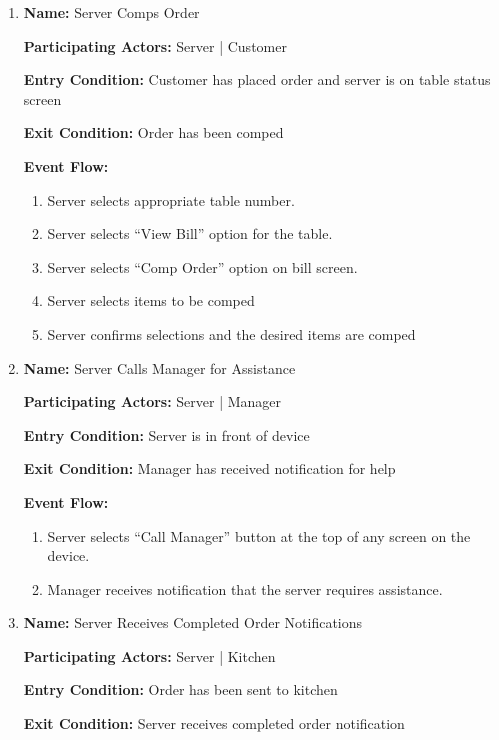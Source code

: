 \documentclass[11pt]{article}
\begin{document}
\begin{enumerate}
		\newpage

		\item \textbf{Name:} 				Server Comps Order

			\textbf{Participating Actors:} 	Server | Customer

			\textbf{Entry Condition:} 		Customer has placed order and server is on table status screen

			\textbf{Exit Condition:} 		Order has been comped

			\textbf{Event Flow:}
			\begin{enumerate}
				\setlength{\leftskip}{1cm}
				\item Server selects appropriate table number.
				\item Server selects ``View Bill'' option for the table.
				\item Server selects ``Comp Order'' option on bill screen.
				\item Server selects items to be comped
				\item Server confirms selections and the desired items are comped\\
			\end{enumerate}

		\item \textbf{Name:} 				Server Calls Manager for Assistance

			\textbf{Participating Actors:} 	Server | Manager

			\textbf{Entry Condition:} 		Server is in front of device

			\textbf{Exit Condition:} 		Manager has received notification for help

			\textbf{Event Flow:}
			\begin{enumerate}
				\setlength{\leftskip}{1cm}
				\item Server selects ``Call Manager'' button at the top of any screen on the device.
				\item Manager receives notification that the server requires assistance.\\
			\end{enumerate}

		\item \textbf{Name:} 				Server Receives Completed Order Notifications

			\textbf{Participating Actors:} 	Server | Kitchen

			\textbf{Entry Condition:} 		Order has been sent to kitchen

			\textbf{Exit Condition:} 		Server receives completed order notification


\end{enumerate}
\end{document}
